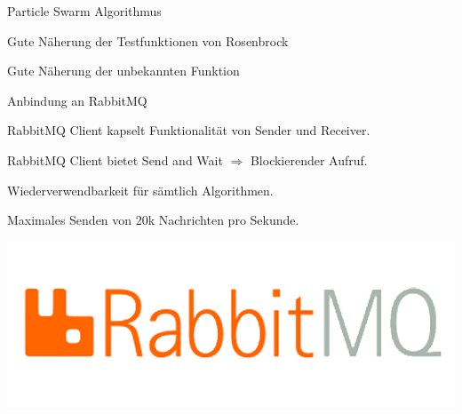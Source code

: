 \documentclass[t,8pt]{beamer}
\begin{document}
\begin{dwHeaderFrame}{Particle Swarm Algorithmus}
	\begin{dwItemize}
		\item Gute Näherung der Testfunktionen von Rosenbrock
		\item Gute Näherung der unbekannten Funktion
	\end{dwItemize}
\end{dwHeaderFrame}
\begin{dwHeaderFrame}{Anbindung an RabbitMQ}
	\begin{dwItemize}
		\item RabbitMQ Client kapselt Funktionalität von Sender und Receiver.
		\item RabbitMQ Client bietet \glqq Send and Wait\grqq{} $\Longrightarrow$ Blockierender Aufruf.
		\item Wiederverwendbarkeit für sämtlich Algorithmen.
	\end{dwItemize}
	\vspace{2mm}
	\begin{dwItemize}
		\item Maximales Senden von 20k Nachrichten pro Sekunde.
	\end{dwItemize}

	\begin{center}
		\includegraphics[scale=0.4]{images/rabbitmq}
	\end{center}
	
\end{dwHeaderFrame}


\end{document}
